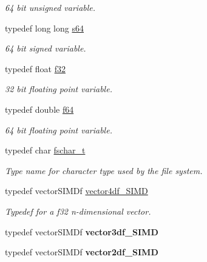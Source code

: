 \begin{DoxyCompactItemize}
\begin{DoxyCompactList}\small\item\em 64 bit unsigned variable. \end{DoxyCompactList}\item 
typedef long long \hyperlink{namespaceirr_abf54bd535f8d4dd996270e68c3ad8c08}{s64}
\begin{DoxyCompactList}\small\item\em 64 bit signed variable. \end{DoxyCompactList}\item 
typedef float \hyperlink{namespaceirr_a0277be98d67dc26ff93b1a6a1d086b07}{f32}
\begin{DoxyCompactList}\small\item\em 32 bit floating point variable. \end{DoxyCompactList}\item 
typedef double \hyperlink{namespaceirr_a1325b02603ad449f92c68fc640af9b28}{f64}
\begin{DoxyCompactList}\small\item\em 64 bit floating point variable. \end{DoxyCompactList}\item 
typedef char \hyperlink{namespaceirr_a813cca9bac9fa0c1427d89720a451460}{fschar\+\_\+t}
\begin{DoxyCompactList}\small\item\em Type name for character type used by the file system. \end{DoxyCompactList}\item 
typedef vector\+S\+I\+M\+Df \hyperlink{namespaceirr_a1445105f2b4fe7ea5b025f5e6a0ccaa9}{vector4df\+\_\+\+S\+I\+MD}\hypertarget{namespaceirr_a1445105f2b4fe7ea5b025f5e6a0ccaa9}{}\label{namespaceirr_a1445105f2b4fe7ea5b025f5e6a0ccaa9}

\begin{DoxyCompactList}\small\item\em Typedef for a f32 n-\/dimensional vector. \end{DoxyCompactList}\item 
typedef vector\+S\+I\+M\+Df {\bfseries vector3df\+\_\+\+S\+I\+MD}\hypertarget{namespaceirr_a9bd4fb6624fb9daf76951d5c7aca0814}{}\label{namespaceirr_a9bd4fb6624fb9daf76951d5c7aca0814}

\item 
typedef vector\+S\+I\+M\+Df {\bfseries vector2df\+\_\+\+S\+I\+MD}\hypertarget{namespaceirr_a91d38da76b89a93a4e4e321db6f9a77e}{}\label{namespaceirr_a91d38da76b89a93a4e4e321db6f9a77e}

\end{DoxyCompactItemize}
